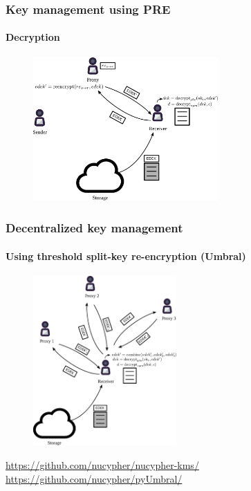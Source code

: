 \documentclass[xetex,mathsans,sans,aspectratio=169]{beamer}
\begin{document}
    \begin{frame}
        \frametitle{Key management using PRE}
        \framesubtitle{Decryption}
        \begin{figure}
            \centering
            \includegraphics[height=5.5cm]{pdf/decrypt.pdf}
        \end{figure}
    \end{frame}

    \begin{frame}
        \frametitle{Decentralized key management}
        \framesubtitle{Using threshold split-key re-encryption (Umbral)}
        \begin{figure}
            \centering
            \includegraphics[height=6.5cm]{pdf/decrypt-umbral.pdf}
        \end{figure}
        \url{https://github.com/nucypher/nucypher-kms/}
        \url{https://github.com/nucypher/pyUmbral/}
    \end{frame}
\end{document}
